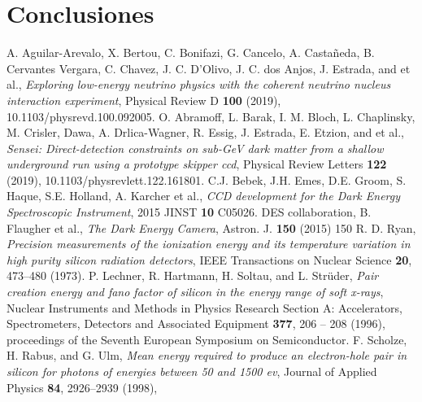 \documentclass[a4paper,12pt]{report}
\begin{document}
\chapter{Conclusiones}\label{conclusiones}

\begin{thebibliography}{99}

A. Aguilar-Arevalo, X. Bertou, C. Bonifazi, G. Cancelo, A. Castañeda, B. Cervantes Vergara, C. Chavez, J. C. D’Olivo, J. C. dos Anjos, J. Estrada, and et al., \textit{Exploring low-energy neutrino physics with the coherent neutrino nucleus interaction experiment}, Physical Review D \textbf{100} (2019), 10.1103/physrevd.100.092005.
O. Abramoff, L. Barak, I. M. Bloch, L. Chaplinsky, M. Crisler, Dawa, A. Drlica-Wagner, R. Essig, J. Estrada, E. Etzion, and et al., \textit{Sensei: Direct-detection constraints on sub-GeV dark matter from a shallow underground run using a prototype skipper ccd}, Physical Review Letters \textbf{122} (2019), 10.1103/physrevlett.122.161801.
C.J. Bebek, J.H. Emes, D.E. Groom, S. Haque, S.E. Holland, A. Karcher et al., \textit{CCD development for the Dark Energy Spectroscopic Instrument}, 2015 JINST \textbf{10} C05026.
DES collaboration, B. Flaugher et al., \textit{The Dark Energy Camera}, Astron. J. \textbf{150} (2015) 150
R. D. Ryan, \textit{Precision measurements of the ionization energy and its temperature variation in high purity silicon radiation detectors}, IEEE Transactions on Nuclear Science \textbf{20}, 473–480 (1973).
P. Lechner, R. Hartmann, H. Soltau, and L. Strüder, \textit{Pair creation energy and fano factor of silicon in the energy range of soft x-rays}, Nuclear Instruments and Methods in Physics Research Section A: Accelerators, Spectrometers, Detectors and Associated Equipment \textbf{377}, 206 – 208 (1996), proceedings of the Seventh European Symposium on Semiconductor.
F. Scholze, H. Rabus, and G. Ulm, \textit{Mean energy required to produce an electron-hole pair in silicon for photons of energies between 50 and 1500 ev}, Journal of Applied Physics \textbf{84}, 2926–2939 (1998),

\end{thebibliography}
\end{document}
